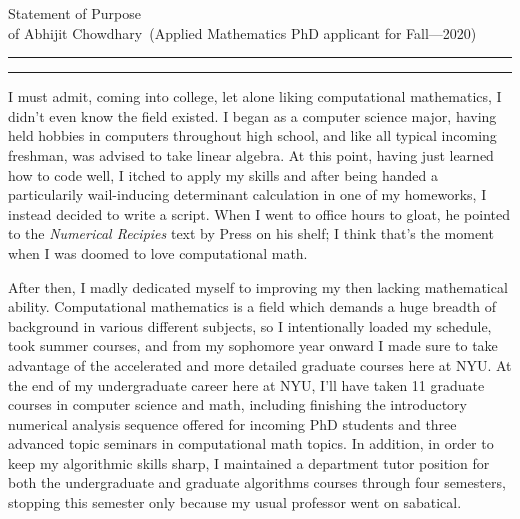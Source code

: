 \documentclass{article}
\newcommand{\soptitle}{Statement of Purpose}
\newcommand{\yourname}{Abhijit Chowdhary}
\begin{document}
\begin{center}\LARGE\soptitle\\
\large of \yourname\ (Applied Mathematics PhD applicant for Fall---2020)
\end{center}

\hrule
\vspace{1pt}
\hrule height 1pt

\bigskip

I must admit, coming into college, let alone liking computational mathematics,
I didn't even know the field existed. I began as a computer science major,
having held hobbies in computers throughout high school, and like all typical
incoming freshman, was advised to take linear algebra. At this point, having
just learned how to code well, I itched to apply my skills and after being
handed a particularily wail-inducing determinant calculation in one of my
homeworks, I instead decided to write a script. When I went to office hours to
gloat, he pointed to the \textit{Numerical Recipies} text by Press on his shelf;
I think that's the moment when I was doomed to love computational math.

After then, I madly dedicated myself to improving my then lacking mathematical
ability. Computational mathematics is a field which demands a huge breadth of
background in various different subjects, so I intentionally loaded my schedule,
took summer courses, and from my sophomore year onward I made sure to take
advantage of the accelerated and more detailed graduate courses here at NYU. At
the end of my undergraduate career here at NYU, I'll have taken 11 graduate
courses in computer science and math, including finishing the introductory
numerical analysis sequence offered for incoming PhD students and three advanced
topic seminars in computational math topics. In addition, in order to keep my
algorithmic skills sharp, I maintained a department tutor position for both the
undergraduate and graduate algorithms courses through four semesters, stopping
this semester only because my usual professor went on sabatical.
\end{document}
